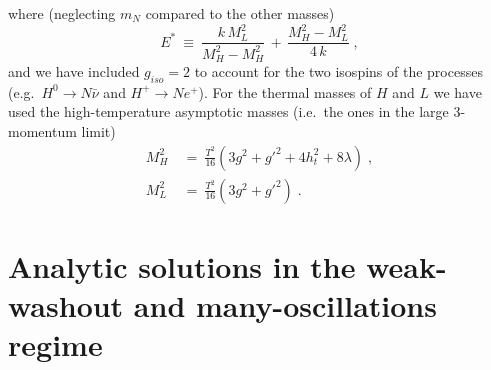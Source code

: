 \documentclass[prd,twocolumn,superscriptaddress,preprintnumbers,nofootinbib,
noshowpacs,groupedaddress]{revtex4-1} %
\begin{document}
where (neglecting $m_N$ compared to the other masses)
\begin{equation}
E^* \ \equiv \ \frac{k \,M^2_L}{M_H^2 - M^2_H} \,+\,  \frac{M_H^2-M_L^2}{4 \,k} \;,
\end{equation}
and we have included $g_{iso} = 2$ to account for the two isospins of the processes (e.g.~$H^0 \to N \bar \nu$ and $H^+ \to N e^+$). For the thermal masses of $H$ and $L$ we have used the high-temperature asymptotic masses (i.e.~the ones in the large 3-momentum limit)
\begin{align}
M_H^2 \ &= \ \frac{T^2}{16} (3 g^2 + g'^2 + 4 h_t^2 + 8 \lambda) \;,\\
M_L^2 \ &= \ \frac{T^2}{16} (3 g^2 + g'^2) \;.
\end{align}



\section{Analytic solutions in the weak-washout and many-oscillations regime}\label{sec:analytic}
\end{document}

